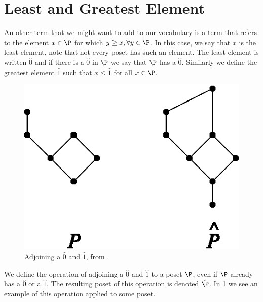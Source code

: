 \section{Least and Greatest Element}
\label{tree:poset:leastandgreatest}

An other term that we might want to add to our vocabulary is a term that refers
to the element $x \in \P$ for which $y \geq x, \forall y \in \P$. In this case,
we say that $x$ is the least element, note that not every poset has such an
element. The least element is written $\hat{0}$ and if there is a $\hat{0}$ in
$\P$ we say that $\P$ has a $\hat{0}$. Similarly we define the greatest element
$\hat{1}$ such that $x \leq \hat{1}$ for all $x \in \P$.

\begin{figure}
	\centering
	\includegraphics[height=0.2\textheight]{fig/stanley/3-3}
	\caption{\label{fig:stanley:3-3} Adjoining a $\hat{0}$ and $\hat{1}$, from
\citet*{Stanley:2011:ECV:2124415}.}
\end{figure}

We define the operation of adjoining a $\hat{0}$ and $\hat{1}$ to a poset $\P$,
even if $\P$ already has a $\hat{0}$ or a $\hat{1}$. The resulting poset of this
operation is denoted $\hat{\P}$. In \ref{fig:stanley:3-3} we see an example of
this operation applied to some poset.




